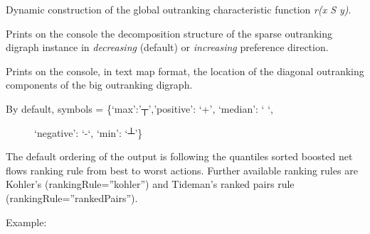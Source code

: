 \documentclass[letterpaper,10pt,english]{sphinxmanual}
\begin{document}
\begin{fulllineitems}
\begin{fulllineitems}
\end{fulllineitems}


\begin{fulllineitems}
\label{techDoc:bigOutrankingDigraphs.BigDigraph.relation}
Dynamic construction of the global outranking characteristic function \emph{r(x S y)}.

\end{fulllineitems}


\begin{fulllineitems}
\label{techDoc:bigOutrankingDigraphs.BigDigraph.showDecomposition}
Prints on the console the decomposition structure of the sparse outranking digraph instance
in \emph{decreasing} (default) or \emph{increasing} preference direction.

\end{fulllineitems}


\begin{fulllineitems}
\label{techDoc:bigOutrankingDigraphs.BigDigraph.showRelationMap}
Prints on the console, in text map format, the location of
the diagonal outranking components of the big outranking digraph.
\begin{description}
\item[{By default, symbols = \{`max':'┬','positive': `+', `median': ` `,}] \leavevmode
`negative': `-`, `min': `┴'\}

\end{description}

The default ordering of the output is following the quantiles sorted boosted net flows ranking rule
from best to worst actions. Further available ranking rules are Kohler's (rankingRule=''kohler'')
and Tideman's ranked pairs rule (rankingRule=''rankedPairs'').

Example:


\end{fulllineitems}
\end{fulllineitems}
\end{document}
